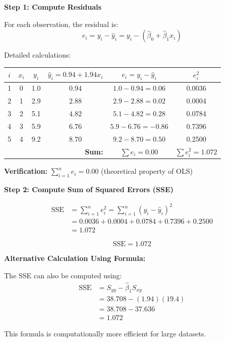 \documentclass[12pt]{article}
\begin{document}
\begin{solution}
\textbf{Step 1: Compute Residuals}

For each observation, the residual is:
\[
e_i = y_i - \hat{y}_i = y_i - (\hat{\beta}_0 + \hat{\beta}_1 x_i)
\]

Detailed calculations:

\begin{center}
\begin{tabular}{|c|c|c|c|c|c|}
\hline
$i$ & $x_i$ & $y_i$ & $\hat{y}_i = 0.94 + 1.94x_i$ & $e_i = y_i - \hat{y}_i$ & $e_i^2$ \\
\hline
1 & 0 & 1.0 & $0.94$ & $1.0 - 0.94 = 0.06$ & 0.0036 \\
2 & 1 & 2.9 & $2.88$ & $2.9 - 2.88 = 0.02$ & 0.0004 \\
3 & 2 & 5.1 & $4.82$ & $5.1 - 4.82 = 0.28$ & 0.0784 \\
4 & 3 & 5.9 & $6.76$ & $5.9 - 6.76 = -0.86$ & 0.7396 \\
5 & 4 & 9.2 & $8.70$ & $9.2 - 8.70 = 0.50$ & 0.2500 \\
\hline
\multicolumn{4}{|r|}{\textbf{Sum:}} & $\sum e_i = 0.00$ & $\sum e_i^2 = 1.072$ \\
\hline
\end{tabular}
\end{center}

\textbf{Verification:} $\sum_{i=1}^{n} e_i = 0.00$ (theoretical property of OLS)

\textbf{Step 2: Compute Sum of Squared Errors (SSE)}

\begin{align*}
\text{SSE} &= \sum_{i=1}^{n} e_i^2 = \sum_{i=1}^{n}(y_i - \hat{y}_i)^2 \\
&= 0.0036 + 0.0004 + 0.0784 + 0.7396 + 0.2500 \\
&= 1.072
\end{align*}

\[
\boxed{\text{SSE} = 1.072}
\]

\textbf{Alternative Calculation Using Formula:}

The SSE can also be computed using:
\begin{align*}
\text{SSE} &= S_{yy} - \hat{\beta}_1 S_{xy} \\
&= 38.708 - (1.94)(19.4) \\
&= 38.708 - 37.636 \\
&= 1.072
\end{align*}

This formula is computationally more efficient for large datasets.


\end{solution}
\end{document}
